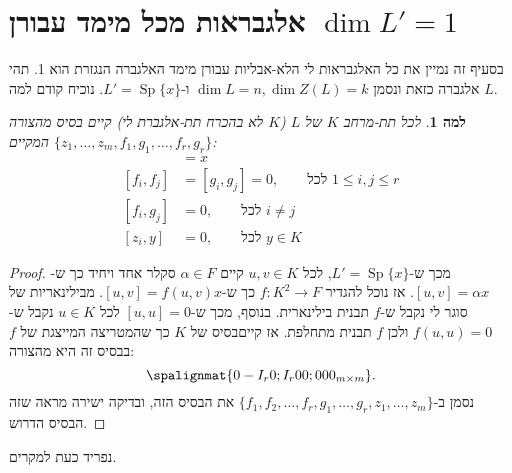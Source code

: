 \documentclass{report}
\theoremstyle{break}
\newtheorem*{unLemma}{למה}
\theoremstyle{MyNonumberbreak}
\newtheorem{proof}{הוכחה}
\DeclareMathOperator{\Sp}{Sp}
\begin{document}
\section{אלגבראות מכל מימד עבורן $\dim L' = 1$}
בסעיף זה נמיין את כל האלגבראות לי הלא-אבליות עבורן מימד האלגברה הנגזרת הוא 1. תהי $L$ אלגברה כזאת ונסמן $\dim L = n, \dim Z(L) = k$ ו-$L' = \Sp\{x\}$. נוכיח קודם למה.
\begin{unLemma}
	לכל תת-מרחב $K$ של $L$ ($K$ לא בהכרח תת-אלגברת לי) קיים בסיס מהצורה $\{z_1, \ldots, z_m, f_1, g_1, \ldots, f_r, g_r\}$ המקיים:
	\begin{align}
		[f_i, g_i] &= x \tag{I} \\
		[f_i, f_j] &= [g_i, g_j] = 0, \qquad \text{לכל $1 \le i, j \le r$} \tag{II} \\
		[f_i, g_j] &= 0, \qquad \text{לכל $i \neq j$} \tag{III} \\
		\nonumber [z_i, y] &= 0, \qquad \text{לכל $y \in K$} \tag{IV}
	\end{align}
\end{unLemma}
\begin{proof}
	מכך ש-$L' = \Sp\{x\}$, לכל $u, v \in K$ קיים $\alpha \in F$ סקלר אחד ויחיד כך ש-$[u, v] = \alpha x$. אז נוכל להגדיר $f : K^2 \to F$ כך ש-$[u, v] = f(u, v) x$. מבילינאריות של סוגר לי נקבל ש-$f$ תבנית בילינארית. בנוסף, מכך ש-$[u, u] = 0$ לכל $u \in K$ נקבל ש-$f(u, u) = 0$ ולכן $f$ תבנית מתחלפת. אז קיים\footnotemark \;בסיס של $K$ כך שהמטריצה המייצגת של $f$ בבסיס זה היא מהצורה:
	\[ \spalignmat{0 -I_r 0 ; I_r 0 0 ; 0 0 0_{m \times m}}. \]
	נסמן ב-$\{f_1, f_2, \ldots, f_r, g_1, \ldots, g_r, z_1, \ldots, z_m\}$ את הבסיס הזה, ובדיקה ישירה מראה שזה הבסיס הדרוש.
\end{proof}
נפריד כעת למקרים.
\end{document}
